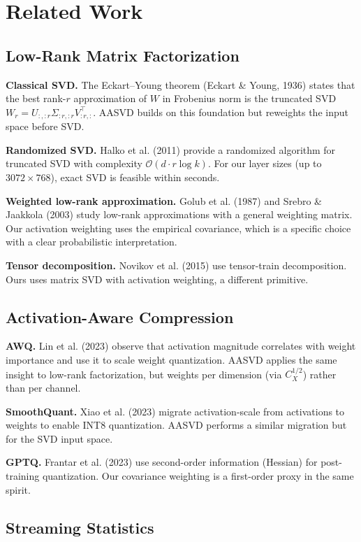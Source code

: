 
\section{Related Work}

\subsection{Low-Rank Matrix Factorization}

\textbf{Classical SVD.} The Eckart--Young theorem (Eckart \& Young, 1936) states 
that the best rank-$r$ approximation of $W$ in Frobenius norm is the 
truncated SVD $W_r = U_{:, :r} \Sigma_{:r, :r} V_{:r, :}^\top$. AASVD builds 
on this foundation but reweights the input space before SVD.

\textbf{Randomized SVD.} Halko et al. (2011) provide a randomized algorithm for 
truncated SVD with complexity $\mathcal{O}(d \cdot r \log k)$. For our layer 
sizes (up to $3072 \times 768$), exact SVD is feasible within seconds.

\textbf{Weighted low-rank approximation.} Golub et al. (1987) and Srebro \& Jaakkola 
(2003) study low-rank approximations with a general weighting matrix. Our 
activation weighting uses the empirical covariance, which is a specific 
choice with a clear probabilistic interpretation.

\textbf{Tensor decomposition.} Novikov et al. (2015) use tensor-train decomposition. 
Ours uses matrix SVD with activation weighting, a different primitive.

\subsection{Activation-Aware Compression}

\textbf{AWQ.} Lin et al. (2023) observe that activation magnitude correlates 
with weight importance and use it to scale weight quantization. AASVD 
applies the same insight to low-rank factorization, but weights per dimension 
(via $C_X^{1/2}$) rather than per channel.

\textbf{SmoothQuant.} Xiao et al. (2023) migrate activation-scale from activations 
to weights to enable INT8 quantization. AASVD performs a similar migration 
but for the SVD input space.

\textbf{GPTQ.} Frantar et al. (2023) use second-order information (Hessian) for 
post-training quantization. Our covariance weighting is a first-order proxy 
in the same spirit.

\subsection{Streaming Statistics}

